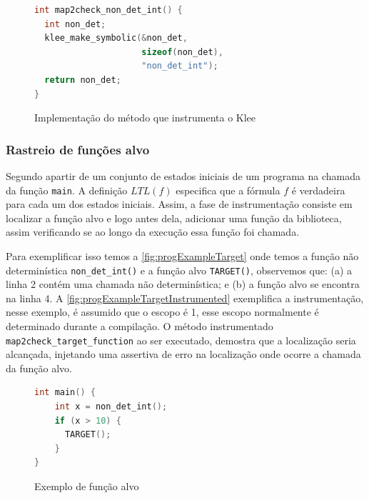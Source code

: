 \begin{figure}[H]
\caption{\label{fig:progNonDetInt} Implementação do método que instrumenta o Klee}
\begin{center}
\begin{minipage}{0.8\textwidth}
  \begin{lstlisting}[language=C]
int map2check_non_det_int() {
  int non_det;
  klee_make_symbolic(&non_det,
                     sizeof(non_det),
                     "non_det_int");
  return non_det;
}
\end{lstlisting}
\end{minipage}
\end{center}
\end{figure}

\subsubsection{Rastreio de funções alvo}

Segundo  apartir de um conjunto de estados iniciais de um programa na chamada da função \texttt{main}. A definição $ LTL(f) $ especifica que a fórmula $f$ é verdadeira para cada um dos estados iniciais. Assim, a fase de instrumentação consiste em localizar a função alvo e logo antes dela, adicionar uma função da biblioteca, assim verificando se ao longo da execução essa função foi chamada.

\par
Para exemplificar isso temos a \autoref{fig:progExampleTarget} onde temos a função não determinística \texttt{non\_det\_int()} e a função alvo \texttt{TARGET()}, observemos que: (a) a linha 2 contém uma chamada não determinística; e (b) a função alvo se encontra na linha 4. A \autoref{fig:progExampleTargetInstrumented} exemplifica a instrumentação, nesse exemplo, é assumido que o escopo é 1, esse escopo normalmente é determinado durante a compilação. O método instrumentado \texttt{map2check\_target\_function} ao ser executado, demostra que a localização seria alcançada, injetando uma assertiva de erro na localização onde ocorre a chamada da função alvo.

\begin{figure}[H]
  \caption{\label{fig:progExampleTarget} Exemplo de função alvo}
  \begin{center}
    \begin{minipage}{0.8\textwidth}
      \begin{lstlisting}[language=C]
int main() {
    int x = non_det_int();
    if (x > 10) {
      TARGET();
    }
}
\end{lstlisting}
\end{minipage}
\end{center}
\end{figure}

